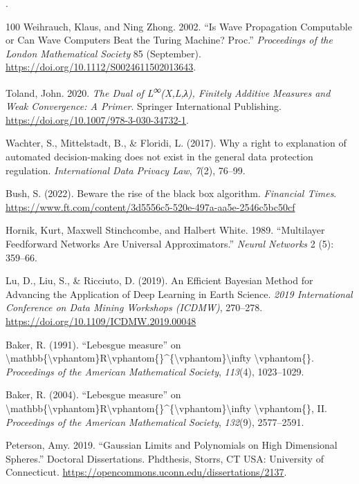 \documentclass[11pt]{book}
\begin{document}
.

\newpage
\begin{thebibliography}{100}
 Weihrauch, Klaus, and Ning Zhong. 2002. {``Is Wave Propagation
Computable or Can Wave Computers Beat the Turing Machine? Proc.''}
\emph{Proceedings of the London Mathematical Society} 85 (September).
\url{https://doi.org/10.1112/S0024611502013643}.

 Toland, John. 2020. \emph{The Dual of L\textsuperscript{∞}(X,L,λ),
Finitely Additive Measures and Weak Convergence: A Primer}. Springer
International Publishing.
\url{https://doi.org/10.1007/978-3-030-34732-1}.

 Wachter, S., Mittelstadt, B., \& Floridi, L. (2017). Why a right to
explanation of automated decision-making does not exist in the general
data protection regulation. \emph{International Data Privacy Law},
\emph{7}(2), 76--99.

 Bush, S. (2022). Beware the rise of the black box algorithm.
\emph{Financial Times}.
\url{https://www.ft.com/content/3d5556c5-520e-497a-aa5e-2546c5bc50cf}

 Hornik, Kurt, Maxwell Stinchcombe, and Halbert White. 1989.
{``Multilayer Feedforward Networks Are Universal Approximators.''}
\emph{Neural Networks} 2 (5): 359--66.

 Lu, D., Liu, S., \& Ricciuto, D. (2019). An Efficient Bayesian Method
for Advancing the Application of Deep Learning in Earth Science.
\emph{2019 International Conference on Data Mining Workshops (ICDMW)},
270--278. \url{https://doi.org/10.1109/ICDMW.2019.00048}

 Baker, R. (1991). {``Lebesgue measure''} on
\textbackslash mathbb\{\textbackslash vphantom\}R\textbackslash vphantom\{\}\^{}\{\textbackslash vphantom\}\textbackslash infty
\textbackslash vphantom\{\}. \emph{Proceedings of the American
Mathematical Society}, \emph{113}(4), 1023--1029.

 Baker, R. (2004). {``Lebesgue measure''} on
\textbackslash mathbb\{\textbackslash vphantom\}R\textbackslash vphantom\{\}\^{}\{\textbackslash vphantom\}\textbackslash infty
\textbackslash vphantom\{\}, II. \emph{Proceedings of the American
Mathematical Society}, \emph{132}(9), 2577--2591.

 Peterson, Amy. 2019. {``Gaussian Limits and Polynomials on High
Dimensional Spheres.''} Doctoral Dissertations. Phdthesis, Storrs, CT
USA: University of Connecticut.
\url{https://opencommons.uconn.edu/dissertations/2137}.


\end{thebibliography}
\end{document}
